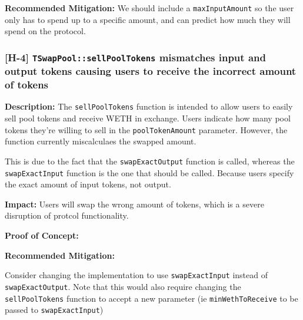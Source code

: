 \textbf{Recommended Mitigation:} We should include a
\texttt{maxInputAmount} so the user only has to spend up to a specific
amount, and can predict how much they will spend on the protocol.

\begin{Shaded}
\begin{Highlighting}[]
\VariableTok{+       \}        }
\end{Highlighting}
\end{Shaded}

\subsubsection{\texorpdfstring{{[}H-4{]}
\texttt{TSwapPool::sellPoolTokens} mismatches input and output tokens
causing users to receive the incorrect amount of
tokens}{{[}H-4{]} TSwapPool::sellPoolTokens mismatches input and output tokens causing users to receive the incorrect amount of tokens}}\label{h-4-tswappoolsellpooltokens-mismatches-input-and-output-tokens-causing-users-to-receive-the-incorrect-amount-of-tokens}

\textbf{Description:} The \texttt{sellPoolTokens} function is intended
to allow users to easily sell pool tokens and receive WETH in exchange.
Users indicate how many pool tokens they're willing to sell in the
\texttt{poolTokenAmount} parameter. However, the function currently
miscalculaes the swapped amount.

This is due to the fact that the \texttt{swapExactOutput} function is
called, whereas the \texttt{swapExactInput} function is the one that
should be called. Because users specify the exact amount of input
tokens, not output.

\textbf{Impact:} Users will swap the wrong amount of tokens, which is a
severe disruption of protcol functionality.

\textbf{Proof of Concept:}

\textbf{Recommended Mitigation:}

Consider changing the implementation to use \texttt{swapExactInput}
instead of \texttt{swapExactOutput}. Note that this would also require
changing the \texttt{sellPoolTokens} function to accept a new parameter
(ie \texttt{minWethToReceive} to be passed to \texttt{swapExactInput})

